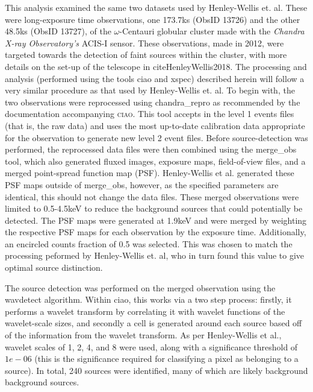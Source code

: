 \documentclass[aps,
                pra,  
                a4paper, 
                amsmath, 
                amssymb, 
                preprint,
                tightenlines,  
                amsfonts,
                nofootinbib,
                notitlepage
            ]{revtex4-2}
\begin{document}
This analysis examined the same two datasets used by Henley-Wellis et. al. These were long-exposure time observations, one 173.7ks (ObsID 13726) and the other 48.5ks (ObsID 13727), of the $\omega$-Centauri globular cluster made with the {\it Chandra X-ray Observatory's} ACIS-I sensor. These observations, made in 2012, were targeted towards the detection of faint sources within the cluster, with more details on the set-up of the telescope in cite{HenleyWellis2018}. The processing and analysis (performed using the tools {\sc ciao} and {\sc xspec}) described herein will follow a very similar procedure as that used by Henley-Wellis et. al. To begin with, the two observations were reprocessed using {\sc chandra\_repro} as recommended by the documentation accompanying \textsc{ciao}. This tool accepts in the level 1 events files (that is, the raw data) and uses the most up-to-date calibration data appropriate for the observation to generate new level 2 event files. Before source-detection was performed, the reprocessed data files were then combined using the {\sc merge\_obs} tool, which also generated fluxed images, exposure maps, field-of-view files, and a merged point-spread function map (PSF). Henley-Wellis et al. generated these PSF maps outside of {\sc merge\_obs}, however, as the specified parameters are identical, this should not change the data files. These merged observations were limited to 0.5-4.5keV to reduce the background sources that could potentially be detected. The PSF maps were generated at 1.9keV and were merged by weighting the respective PSF maps for each observation by the exposure time. Additionally, an encircled counts fraction of 0.5 was selected. This was chosen to match the processing peformed by Henley-Wellis et. al, who in turn found this value to give optimal source distinction. 
\par
The source detection was performed on the merged observation using the {\sc wavdetect} algorithm. Within {\sc ciao}, this works via a two step process: firstly, it performs a wavelet transform by correlating it with wavelet functions of the wavelet-scale sizes, and secondly a cell is generated around each source based off of the information from the wavelet transform. As per Henley-Wellis et al., wavelet scales of 1, 2, 4, and 8 were used, along with a significance threshold of $1e-06$ (this is the significance required for classifying a pixel as belonging to a source). In total, 240 sources were identified, many of which are likely background background sources. 
\par
\end{document}
